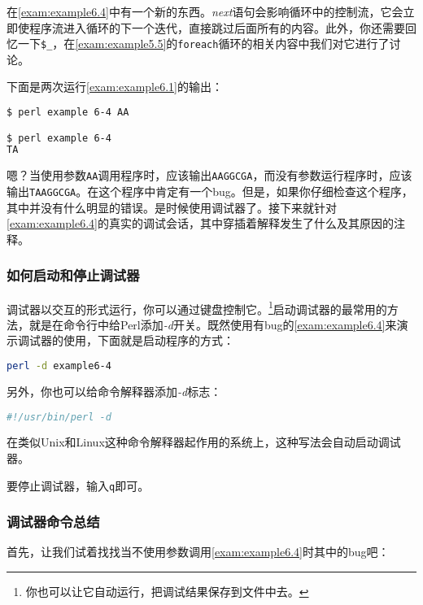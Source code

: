 在\autoref{exam:example6.4}中有一个新的东西。\textit{next}语句会影响循环中的控制流，它会立即使程序流进入循环的下一个迭代，直接跳过后面所有的内容。此外，你还需要回忆一下\verb|$_|，在\autoref{exam:example5.5}的\verb|foreach|循环的相关内容中我们对它进行了讨论。



下面是两次运行\autoref{exam:example6.1}的输出：

\begin{lstlisting}[language=bash]
$ perl example 6-4 AA

$ perl example 6-4
TA
\end{lstlisting}

嗯？当使用参数\verb|AA|调用程序时，应该输出\verb|AAGGCGA|，而没有参数运行程序时，应该输出\verb|TAAGGCGA|。在这个程序中肯定有一个bug。但是，如果你仔细检查这个程序，其中并没有什么明显的错误。是时候使用调试器了。接下来就针对\autoref{exam:example6.4}的真实的调试会话，其中穿插着解释发生了什么及其原因的注释。

\subsubsection{如何启动和停止调试器}
调试器以交互的形式运行，你可以通过键盘控制它。\footnote{你也可以让它自动运行，把调试结果保存到文件中去。}启动调试器的最常用的方法，就是在命令行中给Perl添加\textit{-d}开关。既然使用有bug的\autoref{exam:example6.4}来演示调试器的使用，下面就是启动程序的方式：

\begin{lstlisting}[language=bash]
perl -d example6-4
\end{lstlisting}

另外，你也可以给命令解释器添加\textit{-d}标志：

\begin{lstlisting}[language=bash]
#!/usr/bin/perl -d
\end{lstlisting}

在类似Unix和Linux这种命令解释器起作用的系统上，这种写法会自动启动调试器。

要停止调试器，输入\verb|q|即可。

\subsubsection{调试器命令总结}
首先，让我们试着找找当不使用参数调用\autoref{exam:example6.4}时其中的bug吧：

